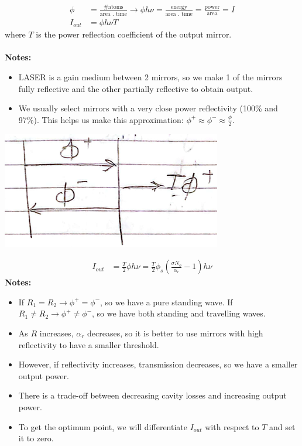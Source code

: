 \documentclass[11pt]{article}
\begin{document}
\begin{align*}
    \phi &= \frac{\text{\# atoms}}{\text{area . time}} \rightarrow \phi h \nu = \frac{\text{energy}}{\text{area . time}} = \frac{\text{power}}{\text{area}} = I \\
    I_{out} &= \phi h \nu T
\end{align*}
where $T$ is the power reflection coefficient of the output mirror. \\ \\
\textbf{Notes:}
\begin{itemize}
    \item LASER is a gain medium between 2 mirrors, so we make 1 of the mirrors fully reflective and the other partially reflective to obtain output.
    \item We usually select mirrors with a very close power reflectivity (100\% and 97\%). This helps us make this approximation: $\phi^+ \approx \phi^- \approx \frac{\phi}{2}$.
\end{itemize}
\begin{center}
    \includegraphics[scale=0.8]{9.png}
\end{center}
\begin{align*}
    I_{out} &= \frac{T}{2} \phi h \nu =  \frac{T}{2} \phi_s \left( \frac{\sigma N_o}{\alpha_r} - 1 \right) h \nu
\end{align*}
\textbf{Notes:}
\begin{itemize}
    \item If $R_1 = R_2 \rightarrow \phi^+ = \phi^-$, so we have a pure standing wave. If $R_1 \neq R_2 \rightarrow \phi^+ \neq \phi^-$, so we have both standing and travelling waves.
    \item As $R$ increases, $\alpha_r$ decreases, so it is better to use mirrors with high reflectivity to have a smaller threshold.
    \item However, if reflectivity increases, transmission decreases, so we have a smaller output power.
    \item There is a trade-off between decreasing cavity losses and increasing output power.
    \item To get the optimum point, we will differentiate $I_{out}$ with respect to $T$ and set it to zero.
\end{itemize}
\end{document}
